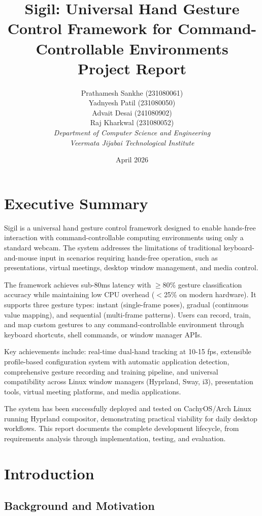 \documentclass[11pt,a4paper]{article}
\title{\textbf{Sigil: Universal Hand Gesture Control Framework for Command-Controllable Environments}\\
\large{Project Report}}
\author{
  Prathamesh Sankhe (231080061) \\
  Yadnyesh Patil (231080050) \\
  Advait Desai (241080902) \\
  Raj Kharkwal (231080052) \\[0.5em]
  \textit{Department of Computer Science and Engineering} \\
  \textit{Veermata Jijabai Technological Institute}
}
\date{April 2026}
\begin{document}
\maketitle
\newpage

\tableofcontents
\newpage

\listoftables
\newpage

\listoffigures
\newpage

\section{Executive Summary}

Sigil is a universal hand gesture control framework designed to enable hands-free interaction with command-controllable computing environments using only a standard webcam. The system addresses the limitations of traditional keyboard-and-mouse input in scenarios requiring hands-free operation, such as presentations, virtual meetings, desktop window management, and media control.

The framework achieves sub-80ms latency with $\geq$80\% gesture classification accuracy while maintaining low CPU overhead ($<$25\% on modern hardware). It supports three gesture types: instant (single-frame poses), gradual (continuous value mapping), and sequential (multi-frame patterns). Users can record, train, and map custom gestures to any command-controllable environment through keyboard shortcuts, shell commands, or window manager APIs.

Key achievements include: real-time dual-hand tracking at 10-15 fps, extensible profile-based configuration system with automatic application detection, comprehensive gesture recording and training pipeline, and universal compatibility across Linux window managers (Hyprland, Sway, i3), presentation tools, virtual meeting platforms, and media applications.

The system has been successfully deployed and tested on CachyOS/Arch Linux running Hyprland compositor, demonstrating practical viability for daily desktop workflows. This report documents the complete development lifecycle, from requirements analysis through implementation, testing, and evaluation.

\section{Introduction}

\subsection{Background and Motivation}
\end{document}
